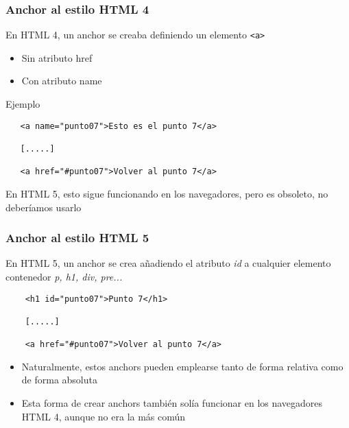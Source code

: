 \documentclass[ucs]{beamer}
\begin{document}
\begin{frame}[fragile]
\frametitle{Anchor al estilo HTML 4}
En HTML 4, un anchor se creaba definiendo un elemento 
\verb|<a>|

\begin{itemize}
\item
Sin atributo href

\item
Con atributo name
\end{itemize}

Ejemplo

  \begin{footnotesize}
  \begin{verbatim}
   <a name="punto07">Esto es el punto 7</a>
 
   [.....]

   <a href="#punto07">Volver al punto 7</a>
  \end{verbatim}
  \end{footnotesize}

En HTML 5, esto sigue funcionando en los navegadores, pero
es obsoleto, no deberíamos usarlo

\end{frame}

\begin{frame}[fragile]
\frametitle{Anchor al estilo HTML 5}
En HTML 5, un anchor se crea añadiendo el atributo
\emph{id}
a cualquier elemento contenedor
\emph{p, h1, div, pre...}

  \begin{footnotesize}
  \begin{verbatim}
    <h1 id="punto07">Punto 7</h1>

    [.....]

    <a href="#punto07">Volver al punto 7</a>
  \end{verbatim}
  \end{footnotesize}


    \begin{itemize}
    \item
Naturalmente, estos anchors pueden emplearse tanto de forma
relativa como de forma absoluta

    \item
Esta forma de crear anchors también solía funcionar en los navegadores HTML 4, 
aunque no era la más común 
    \end{itemize}


\end{frame}
\end{document}
